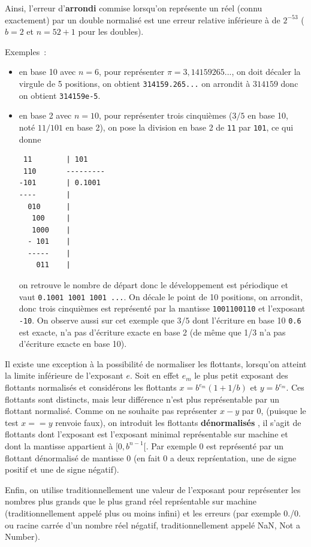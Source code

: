 \documentclass[a4paper,11pt]{article}
\begin{document}
Ainsi, l'erreur d'{\bf arrondi} commise lorsqu'on
représente un réel (connu exactement) par un double normalis\'e 
est une erreur relative inf\'erieure \`a
de $2^{-53}$ ($b=2$ et $n=52+1$ pour les doubles).

Exemples~: 
\begin{itemize}
\item en base 10 avec $n=6$, pour repr\'esenter
$\pi=3,14159265...$, on doit d\'ecaler la virgule de 5 positions,
on obtient \verb|314159.265...| on arrondit \`a $314159$ donc
on obtient \verb|314159e-5|.
\item en base 2 avec $n=10$, pour repr\'esenter trois cinqui\`emes ($3/5$
en base 10, not\'e $11/101$ en base 2), 
on pose la division en base 2 de \verb|11| par 
\verb|101|, ce qui donne
\begin{verbatim}
 11        | 101
 110       ---------
-101       | 0.1001
----       |
  010      |
   100     |
   1000    |
  - 101    |
  -----    |
    011    |
\end{verbatim}
on retrouve le nombre de d\'epart donc le d\'eveloppement est
p\'eriodique et vaut \verb|0.1001 1001 1001 ...|.
On d\'ecale le point de 10 positions, on arrondit,
donc trois cinqui\`emes est
repr\'esent\'e par la mantisse \verb|1001100110| et l'exposant
\verb|-10|. On observe aussi sur cet exemple que $3/5$ dont l'\'ecriture
en base 10 \verb|0.6| est exacte, n'a pas d'\'ecriture exacte en base
2 (de m\^eme que 1/3 n'a pas d'\'ecriture exacte en base 10).
\end{itemize}

Il existe une exception \`a la possibilit\'e de normaliser les flottants,
lorsqu'on atteint la limite inf\'erieure de l'exposant $e$. 
Soit en effet $e_m$ le plus petit exposant des flottants normalis\'es
et consid\'erons les flottants $x=b^{e_m}(1+1/b)$ et $y=b^{e_m}$. Ces
flottants sont distincts, 
mais leur diff\'erence n'est plus repr\'esentable par un flottant normalis\'e.
Comme on ne souhaite pas repr\'esenter $x-y$ par 0, 
(puisque le test $x==y$ renvoie faux), on introduit les flottants 
{\bf d\'enormalis\'es} , il s'agit de
flottants dont l'exposant est l'exposant minimal repr\'esentable sur
machine et dont la mantisse appartient \`a $[0,b^{n-1}[$. Par exemple
0 est repr\'esent\'e par un flottant d\'enormalis\'e de mantisse 0
(en fait 0 a deux repr\'sentation, une de signe positif et une de
signe n\'egatif).

Enfin, on utilise traditionnellement une valeur de l'exposant pour
repr\'esenter les nombres plus grands que le plus grand r\'eel
repr\'sentable sur machine (traditionnellement appel\'e plus ou
moins infini)
et les erreurs (par exemple 0./0. ou racine carr\'ee d'un nombre
r\'eel n\'egatif, traditionnellement appel\'e NaN, Not a Number).
\end{document}
